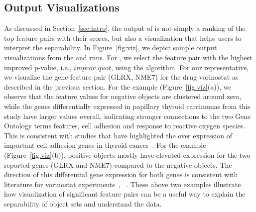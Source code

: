 
\subsection{Output Visualizations}\label{ssec:viz}
As discussed in Section~\ref{sec:intro}, the output of \genviz is not simply a ranking of the top feature pairs with their scores, but also a visualization that helps users to interpret the separability. In Figure~\ref{fig:viz}, we depict sample output visualizations from the \msig and \lincs runs. For \msig, we select the feature pair with the highest improved p-value, i.e., $improv\_quot$, using the \sampOpt algorithm. For our \lincs representative, we visualize the gene feature pair (GLRX, NME7) for the drug vorinostat as described in the previous section.
For the \msig example (Figure~\ref{fig:viz}(a)), we observe that the feature values for negative objects are clustered around zero, while the genes differentially expressed in papillary thyroid carcinomas from this \msig study have larger values overall, indicating stronger connections to the two Gene Ontology terms features, cell adhesion and response to reactive oxygen species. This is consistent with studies that have highlighted the over expression of important cell adhesion genes in thyroid cancer~\cite{gorka2007nrcam}. For the \lincs example (Figure~\ref{fig:viz}(b)), positive objects mostly have elevated expression for the two reported genes (GLRX and NME7) compared to the negative objects. The direction of this differential gene expression for both genes is consistent with literature for vorinostat experiments~\cite{qi2014systematic}, ~\cite{soldi2013genomic}. These above two examples illustrate how visualization of significant feature pairs can be a useful way to explain the separability of object sets and understand the data.
